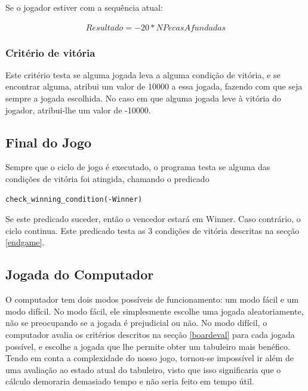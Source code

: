 \documentclass[a4paper]{article}
\begin{document}
Se o jogador estiver com a sequência atual:

\begin{equation*}
\begin{multlined}
Resultado = -20 * NPecasAfundadas
\end{multlined}
\end{equation*}

\subsubsection{Critério de vitória}

Este critério testa se alguma jogada leva a alguma condição de vitória, e se encontrar alguma, atribui um valor de 10000 a essa jogada, fazendo com que seja sempre a jogada escolhida. No caso em que alguma jogada leve à vitória do jogador, atribui-lhe um valor de -10000.

\subsection{Final do Jogo}

Sempre que o ciclo de jogo é executado, o programa testa se alguma das condições de vitória foi atingida, chamando o predicado

\begin{lstlisting}
check_winning_condition(-Winner)
\end{lstlisting}

Se este predicado suceder, então o vencedor estará em Winner. Caso contrário, o ciclo continua. Este predicado testa as 3 condições de vitória descritas na secção  \ref{endgame}. 

\subsection{Jogada do Computador}

O computador tem dois modos possíveis de funcionamento: um modo fácil e um modo difícil. No modo fácil, ele simplesmente escolhe uma jogada aleatoriamente, não se preocupando se a jogada é prejudicial ou não. No modo difícil, o computador avalia os critérios descritos na secção \ref{boardeval} para cada jogada possível, e escolhe a jogada que lhe permite obter um tabuleiro mais benéfico. Tendo em conta a complexidade do nosso jogo, tornou-se impossível ir além de uma avaliação ao estado atual do tabuleiro, visto que isso significaria que o cálculo demoraria demasiado tempo e não seria feito em tempo útil.
\end{document}
